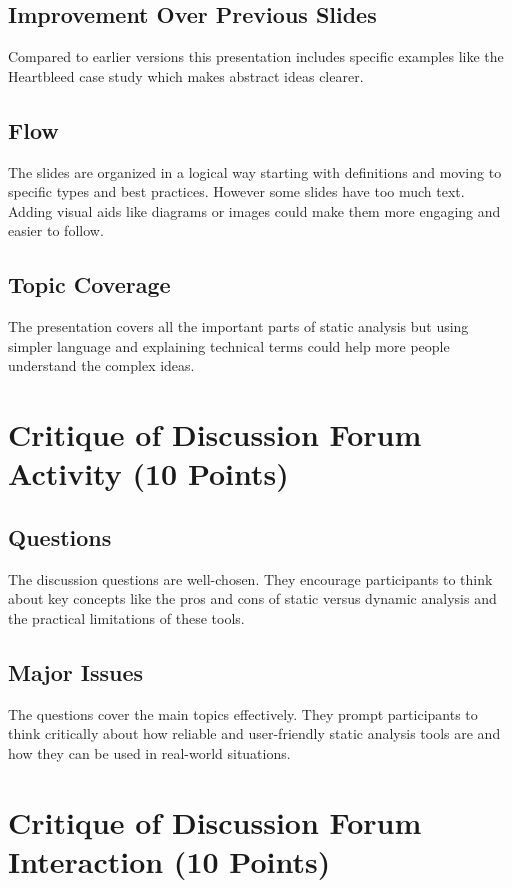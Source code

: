 \documentclass{article}
\begin{document}
\subsection*{Improvement Over Previous Slides}
Compared to earlier versions this presentation includes specific examples like the Heartbleed case study which makes abstract ideas clearer.

\subsection*{Flow}
The slides are organized in a logical way starting with definitions and moving to specific types and best practices. However some slides have too much text. Adding visual aids like diagrams or images could make them more engaging and easier to follow.

\subsection*{Topic Coverage}
The presentation covers all the important parts of static analysis but using simpler language and explaining technical terms could help more people understand the complex ideas.

\section*{Critique of Discussion Forum Activity (10 Points)}

\subsection*{Questions}
The discussion questions are well-chosen. They encourage participants to think about key concepts like the pros and cons of static versus dynamic analysis and the practical limitations of these tools.

\subsection*{Major Issues}
The questions cover the main topics effectively. They prompt participants to think critically about how reliable and user-friendly static analysis tools are and how they can be used in real-world situations.

\section*{Critique of Discussion Forum Interaction (10 Points)}
\end{document}
